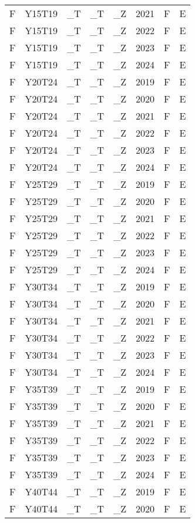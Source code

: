 \begin{longtable}[t]{llllllll}
F & Y15T19 & \_T & \_T & \_Z & 2021 & F & E\\
F & Y15T19 & \_T & \_T & \_Z & 2022 & F & E\\
F & Y15T19 & \_T & \_T & \_Z & 2023 & F & E\\
F & Y15T19 & \_T & \_T & \_Z & 2024 & F & E\\
\addlinespace
F & Y20T24 & \_T & \_T & \_Z & 2019 & F & E\\
F & Y20T24 & \_T & \_T & \_Z & 2020 & F & E\\
F & Y20T24 & \_T & \_T & \_Z & 2021 & F & E\\
F & Y20T24 & \_T & \_T & \_Z & 2022 & F & E\\
F & Y20T24 & \_T & \_T & \_Z & 2023 & F & E\\
\addlinespace
F & Y20T24 & \_T & \_T & \_Z & 2024 & F & E\\
F & Y25T29 & \_T & \_T & \_Z & 2019 & F & E\\
F & Y25T29 & \_T & \_T & \_Z & 2020 & F & E\\
F & Y25T29 & \_T & \_T & \_Z & 2021 & F & E\\
F & Y25T29 & \_T & \_T & \_Z & 2022 & F & E\\
\addlinespace
F & Y25T29 & \_T & \_T & \_Z & 2023 & F & E\\
F & Y25T29 & \_T & \_T & \_Z & 2024 & F & E\\
F & Y30T34 & \_T & \_T & \_Z & 2019 & F & E\\
F & Y30T34 & \_T & \_T & \_Z & 2020 & F & E\\
F & Y30T34 & \_T & \_T & \_Z & 2021 & F & E\\
\addlinespace
F & Y30T34 & \_T & \_T & \_Z & 2022 & F & E\\
F & Y30T34 & \_T & \_T & \_Z & 2023 & F & E\\
F & Y30T34 & \_T & \_T & \_Z & 2024 & F & E\\
F & Y35T39 & \_T & \_T & \_Z & 2019 & F & E\\
F & Y35T39 & \_T & \_T & \_Z & 2020 & F & E\\
\addlinespace
F & Y35T39 & \_T & \_T & \_Z & 2021 & F & E\\
F & Y35T39 & \_T & \_T & \_Z & 2022 & F & E\\
F & Y35T39 & \_T & \_T & \_Z & 2023 & F & E\\
F & Y35T39 & \_T & \_T & \_Z & 2024 & F & E\\
F & Y40T44 & \_T & \_T & \_Z & 2019 & F & E\\
\addlinespace
F & Y40T44 & \_T & \_T & \_Z & 2020 & F & E\\

\end{longtable}
